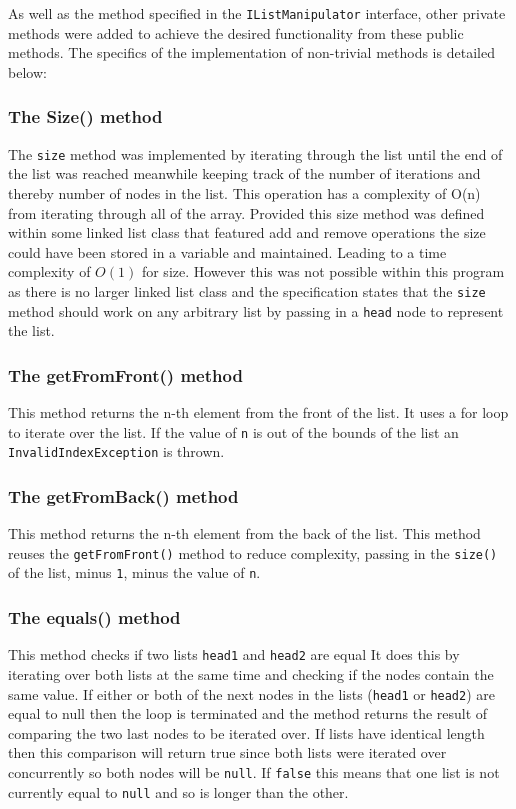 \documentclass{article}
\begin{document}
\noindent As well as the method specified in the \verb+IListManipulator+ interface, other private methods were added to achieve the desired functionality from these public methods. The specifics of the implementation of non-trivial methods is detailed below:
\subsubsection{The Size() method}
The \verb+size+ method was implemented by iterating through the list until the end of the list was reached meanwhile keeping track of the number of iterations and thereby number of nodes in the list. This operation has a complexity of O(n) from iterating through all of the array. Provided this size method was defined within some linked list class that featured add and remove operations the size could have been stored in a variable and maintained. Leading to a time complexity of $O(1)$ for size. However this was not possible within this program as there is no larger linked list class and the specification states that the \verb+size+ method should work on any arbitrary list by passing in a \verb+head+ node to represent the list.
\subsubsection{The getFromFront() method}
This method returns the n-th element from the front of the list. It uses a for loop to iterate over the list. If the value of \verb+n+ is out of the bounds of the list an \verb+InvalidIndexException+ is thrown.

\subsubsection{The getFromBack() method}
This method returns the n-th element from the back of the list. This method reuses the \verb+getFromFront()+ method to reduce complexity, passing in the \verb+size()+ of the list, minus \verb+1+, minus the value of \verb+n+.

\subsubsection{The equals() method}
This method checks if two lists \verb+head1+ and \verb+head2+ are equal It does this by iterating over both lists at the same time and checking if the nodes contain the same value. If either or both of the next nodes in the lists (\verb+head1+ or \verb+head2+) are equal to null then the loop is terminated and the method returns the result of comparing the two last nodes to be iterated over. If lists have identical length then this comparison will return true since both lists were iterated over concurrently so both nodes will be \verb+null+. If \verb+false+ this means that one list is not currently equal to \verb+null+ and so is longer than the other.
\end{document}
